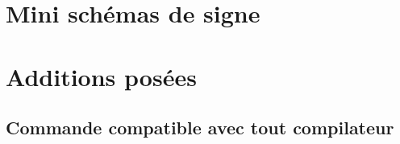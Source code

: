 \section{Mini schémas de signe}

\begin{PresCodeLaTeX}{}
\MiniSchemaSignes*[Code=expo+]
\end{PresCodeLaTeX}

\begin{PresCodeLaTeX}{}
\MiniSchemaSignes*[Code=expo-]
\end{PresCodeLaTeX}

\begin{PresCodeLaTeX}{}
\MiniSchemaSignes*[Code=exposol+,Racines={a}]
\end{PresCodeLaTeX}

\begin{PresCodeLaTeX}{}
\MiniSchemaSignes*[Code=exposol-,Racines={b}]
\end{PresCodeLaTeX}

\begin{PresCodeLaTeX}{}
\MiniSchemaSignes*[Code=lnsol+,Racines={c}]
\end{PresCodeLaTeX}

\section{Additions posées}

\subsection{Commande compatible avec tout compilateur}

\begin{PresCodeLaTeX}{}
\end{PresCodeLaTeX}

\begin{PresCodeLaTeX}{}
\end{PresCodeLaTeX}

\begin{PresCodeLaTeX}{}
\end{PresCodeLaTeX}

\begin{PresCodeLaTeX}{}
\end{PresCodeLaTeX}

